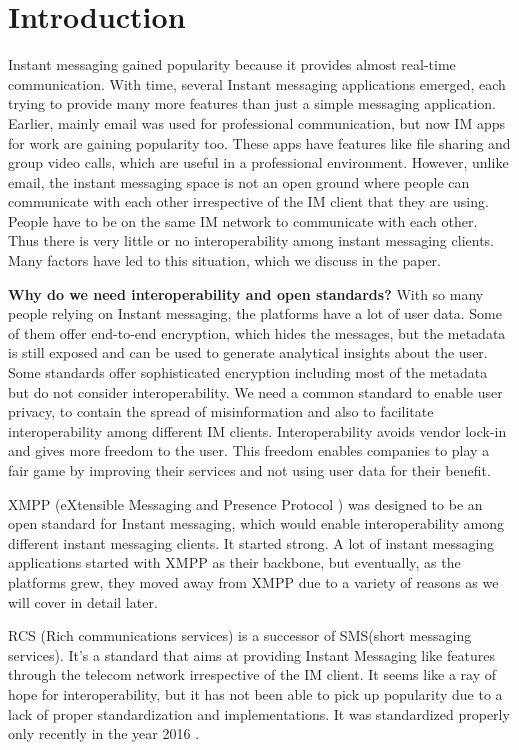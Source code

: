 \documentclass[11pt, conference, a4paper]{IEEEtran}
\begin{document}
\section{Introduction}
\label{SEC:introduction}
Instant messaging gained popularity because it provides almost real-time communication. With time, several Instant messaging applications emerged, each trying to provide many more features than just a simple messaging application. Earlier, mainly email was used for professional communication, but now IM apps for work are gaining popularity too. These apps have features like file sharing and group video calls, which are useful in a professional environment.
However, unlike email, the instant messaging space is not an open ground where people can communicate with each other irrespective of the IM client that they are using. People have to be on the same IM network to communicate with each other. Thus there is very little or no interoperability among instant messaging clients. Many factors have led to this situation, which we discuss in the paper.
\par
\textbf{Why do we need interoperability and open standards?}
With so many people relying on Instant messaging, the platforms have a lot of user data. Some of them offer end-to-end encryption, which hides the messages, but the metadata is still exposed and can be used to generate analytical insights about the user. Some standards offer sophisticated encryption including most of the metadata but do not consider interoperability. 
We need a common standard to enable user privacy, to contain the spread of misinformation and also to facilitate interoperability among different IM clients. Interoperability avoids vendor lock-in and gives more freedom to the user. This freedom enables companies to play a fair game by improving their services and not using user data for their benefit.
\par
XMPP (eXtensible Messaging and Presence Protocol ) was designed to be an open standard for Instant messaging, which would enable interoperability among different instant messaging clients. It started strong. A lot of instant messaging applications started with XMPP as their backbone, but eventually, as the platforms grew, they moved away from XMPP due to a variety of reasons as we will cover in detail later.
\par
RCS (Rich communications services) is a successor of SMS(short messaging services). It's a standard that aims at providing Instant Messaging like features through the telecom network irrespective of the IM client. It seems like a ray of hope for interoperability, but it has not been able to pick up popularity due to a lack of proper standardization and implementations. It was standardized properly only recently in the year 2016 \cite{rcs-wiki}.
\end{document}
